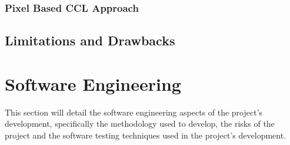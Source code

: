 \documentclass[12pt]{article}
\begin{document}


    \subsubsection{Pixel Based CCL Approach}\label{subsubsec:pixel-based-ccl-approach}



    \subsection{Limitations and Drawbacks}\label{subsec:limitations-and-drawbacks}




    \pagebreak


    \section{Software Engineering}\label{sec:software-engineering}

    \tab
    This section will detail the software engineering aspects of the project's development, specifically the
    methodology used to develop, the risks of the project and the software testing techniques used in the project's
    development.
\end{document}
